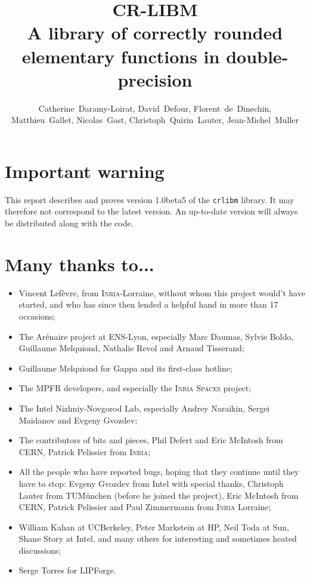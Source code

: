 \documentclass[a4paper]{book}
\title{CR-LIBM\\A library of correctly rounded elementary functions in double-precision}
\author{\mbox{Catherine Daramy-Loirat}, \mbox{David Defour}, \mbox{Florent~de~Dinechin},\\ \mbox{Matthieu Gallet}, \mbox{Nicolas Gast},  \mbox{Christoph Quirin Lauter}, \mbox{Jean-Michel Muller}}
\begin{document}
\maketitle


\section*{Important warning}

This report describes and proves version 1.0beta5 of the
\texttt{crlibm} library. It may therefore not correspond to the latest
version. An up-to-date version will always be distributed along with
the code.

\vfill
\section*{Many thanks to...}
\begin{itemize}
\item Vincent Lef\`evre, from \textsc{Inria}-Lorraine, without whom this
  project would't have started, and who has since then lended a helpful hand in
  more than 17 occasions;
\item The Ar\'enaire project at ENS-Lyon, especially Marc Daumas,
  Sylvie Boldo, Guillaume Melquiond, Nathalie Revol and Arnaud
  Tisserand;
\item Guillaume Melquiond for Gappa and its first-class hotline;
\item The MPFR developers, and especially the \textsc{Inria}
  \textsc{Spaces} project;
\item The Intel Nizhniy-Novgorod Lab, especially Andrey Naraikin,
  Sergei Maidanov and Evgeny Gvozdev;
\item The contributors of bits and pieces, Phil Defert and Eric
  McIntosh from CERN, Patrick Pelissier from \textsc{Inria};
\item All the people who have reported bugs, hoping that they continue
  until they have to stop: Evgeny Gvozdev from Intel with special
  thanks, Christoph Lauter from TUM\"unchen (before he joined the
  project), Eric McIntosh from CERN, Patrick Pelissier and Paul
  Zimmermann from \textsc{Inria} Lorraine;
\item William Kahan at UCBerkeley, Peter Markstein at HP, Neil Toda at
  Sun, Shane Story at Intel, and many others for interesting and
  sometimes heated discussions;
\item Serge Torres for LIPForge.
\end{itemize}
\end{document}
